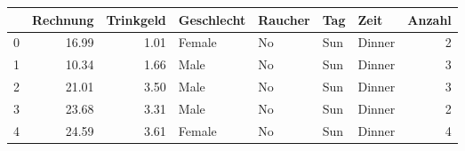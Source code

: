 \begin{tabular}{lrrllllr}
\toprule
 & Rechnung & Trinkgeld & Geschlecht & Raucher & Tag & Zeit & Anzahl \\
\midrule
0 & 16.99 & 1.01 & Female & No & Sun & Dinner & 2 \\
1 & 10.34 & 1.66 & Male & No & Sun & Dinner & 3 \\
2 & 21.01 & 3.50 & Male & No & Sun & Dinner & 3 \\
3 & 23.68 & 3.31 & Male & No & Sun & Dinner & 2 \\
4 & 24.59 & 3.61 & Female & No & Sun & Dinner & 4 \\
\bottomrule
\end{tabular}
